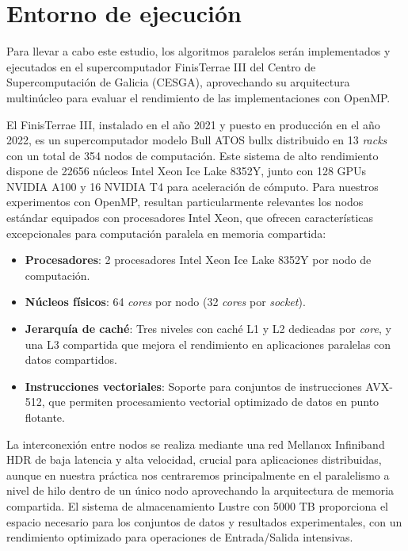 \chapter{Entorno de ejecución}

Para llevar a cabo este estudio, los algoritmos paralelos serán implementados y ejecutados en el supercomputador FinisTerrae III del Centro de Supercomputación de Galicia (CESGA), aprovechando su arquitectura multinúcleo para evaluar el rendimiento de las implementaciones con OpenMP.

El FinisTerrae III, instalado en el año 2021 y puesto en producción en el año 2022, es un supercomputador modelo Bull ATOS bullx distribuido en 13 \textit{racks} con un total de 354 nodos de computación. Este sistema de alto rendimiento dispone de 22656 núcleos Intel Xeon Ice Lake 8352Y, junto con 128 GPUs NVIDIA A100 y 16 NVIDIA T4 para aceleración de cómputo. Para nuestros experimentos con OpenMP, resultan particularmente relevantes los nodos estándar equipados con procesadores Intel Xeon, que ofrecen características excepcionales para computación paralela en memoria compartida:

\begin{itemize}

    \item \textbf{Procesadores}: 2 procesadores Intel Xeon Ice Lake 8352Y por nodo de computación.
    
    \item \textbf{Núcleos físicos}: 64 \textit{cores} por nodo (32 \textit{cores} por \textit{socket}).
    
    \item \textbf{Jerarquía de caché}: Tres niveles con caché L1 y L2 dedicadas por \textit{core}, y una L3 compartida que mejora el rendimiento en aplicaciones paralelas con datos compartidos.
    
    \item \textbf{Instrucciones vectoriales}: Soporte para conjuntos de instrucciones AVX-512, que permiten procesamiento vectorial optimizado de datos en punto flotante.
    
\end{itemize}

La interconexión entre nodos se realiza mediante una red Mellanox Infiniband HDR de baja latencia y alta velocidad, crucial para aplicaciones distribuidas, aunque en nuestra práctica nos centraremos principalmente en el paralelismo a nivel de hilo dentro de un único nodo aprovechando la arquitectura de memoria compartida. El sistema de almacenamiento Lustre con 5000 TB proporciona el espacio necesario para los conjuntos de datos y resultados experimentales, con un rendimiento optimizado para operaciones de Entrada/Salida intensivas.

